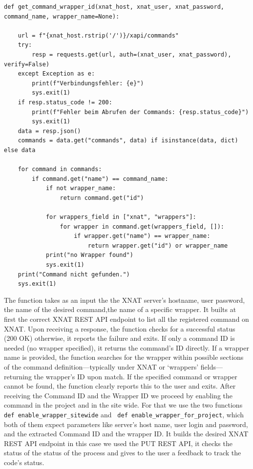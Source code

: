 \begin{lstlisting}
def get_command_wrapper_id(xnat_host, xnat_user, xnat_password, command_name, wrapper_name=None):
 
    url = f"{xnat_host.rstrip('/')}/xapi/commands"
    try:
        resp = requests.get(url, auth=(xnat_user, xnat_password), verify=False)
    except Exception as e:
        print(f"Verbindungsfehler: {e}")
        sys.exit(1)
    if resp.status_code != 200:
        print(f"Fehler beim Abrufen der Commands: {resp.status_code}")
        sys.exit(1)
    data = resp.json()
    commands = data.get("commands", data) if isinstance(data, dict) else data

    for command in commands:
        if command.get("name") == command_name:
            if not wrapper_name:
                return command.get("id")
            
            for wrappers_field in ["xnat", "wrappers"]:
                for wrapper in command.get(wrappers_field, []):
                    if wrapper.get("name") == wrapper_name:
                        return wrapper.get("id") or wrapper_name
            print("no Wrapper found")
            sys.exit(1)
    print("Command nicht gefunden.")
    sys.exit(1)
\end{lstlisting}
The function takes as an input the the XNAT server’s hostname, user password, the name of the desired command,the name of a specific wrapper. It builts at first the correct XNAT REST API endpoint to list all the registered command on XNAT.
Upon receiving a response, the function checks for a successful status (200 OK) otherwise, it reports the failure and exits. If only a command ID is needed (no wrapper specified), it returns the command’s ID directly. If a wrapper name is provided, the function searches for the wrapper within possible sections of the command definition—typically under XNAT or ‘wrappers’ fields—returning the wrapper’s ID upon match. If the specified command or wrapper cannot be found, the function clearly reports this to the user and exits.
After receiving the Command ID and the Wrapper ID we proceed by enabling the command in the project and in the site wide. For that we use the two functions \texttt{def enable\_wrapper\_sitewide} and \texttt{ def enable\_wrapper\_for\_project}, which both of them expect parameters like server’s host name, user login and  password, and the extracted Command ID and the wrapper ID. It builds the desired XNAT REST API endpoint in this case we used the PUT REST API, it checks the status of the status of the process and gives to the user a feedback to track the code's status.

